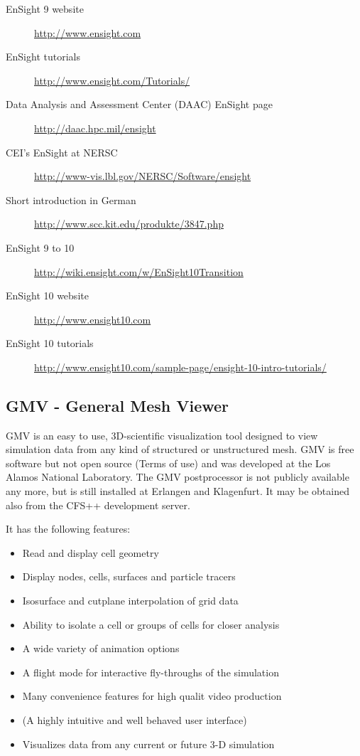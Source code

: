 \begin{description}
\item[EnSight 9 website] \url{http://www.ensight.com}


\item[EnSight tutorials] \url{http://www.ensight.com/Tutorials/}

\item[Data Analysis and Assessment Center (DAAC) EnSight page] \url{http://daac.hpc.mil/ensight}

\item[CEI's EnSight at NERSC] \url{http://www-vis.lbl.gov/NERSC/Software/ensight}

\item[Short  introduction in German] \url{http://www.scc.kit.edu/produkte/3847.php}

\item[EnSight 9 to 10] \url{http://wiki.ensight.com/w/EnSight10Transition}

\item[EnSight 10 website] \url{http://www.ensight10.com}

\item[EnSight 10 tutorials] \url{http://www.ensight10.com/sample-page/ensight-10-intro-tutorials/}
\end{description}


\subsection{GMV  -  General  Mesh  Viewer}

GMV  is an  easy to  use, 3D-scientific  visualization tool  designed  to view
simulation data from any kind of  structured or unstructured mesh. GMV is free
software  but not open  source (Terms  of use)  and was  developed at  the Los
Alamos National  Laboratory.  The GMV postprocessor is  not publicly available
any  more, but  is still  installed  at Erlangen  and Klagenfurt.   It may  be
obtained also from the CFS++ development server.

\noindent It has the following features:
\begin{itemize}
    \item Read and display cell geometry
    \item Display nodes, cells, surfaces and particle tracers
    \item Isosurface and cutplane interpolation of grid data
    \item Ability to isolate a cell or groups of cells for closer analysis
    \item A wide variety of animation options
    \item A flight mode for interactive fly-throughs of the simulation
    \item Many convenience features for high qualit video production
    \item (A highly intuitive and well behaved user interface)
    \item Visualizes data from any current or future 3-D simulation 
\end{itemize}

